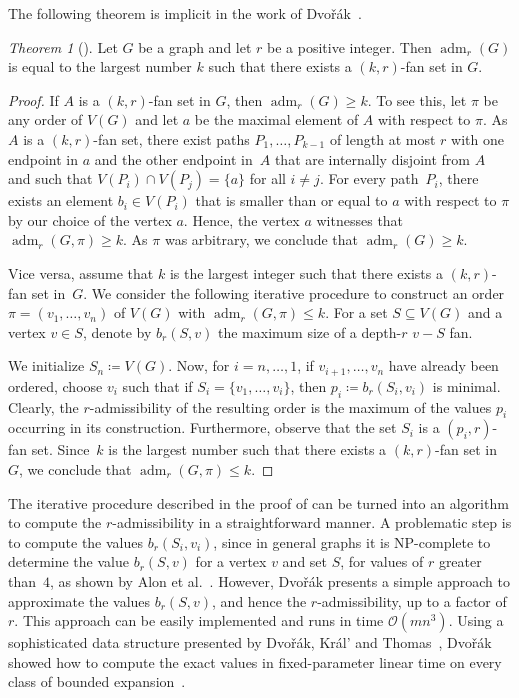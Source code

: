 \documentclass[1p,number,a4paper]{elsarticle}
\theoremstyle{remark}
\newcommand{\Oof}{\mathcal{O}}
\DeclareMathOperator{\adm}{adm}
\newtheorem{theorem}{Theorem}[section]
\begin{document}
The following theorem is implicit in the work of Dvo\v{r}\'ak~\cite{dvovrak2013constant}. 

\begin{theorem}[\cite{dvovrak2013constant}]\label{thm:adm}
Let $G$ be a graph and let $r$ be a positive integer. Then 
$\adm_r(G)$ is equal to the largest number $k$ such that
there exists a $(k,r)$-fan set in $G$. 
\end{theorem}
\begin{proof}
If $A$ is a $(k,r)$-fan set in $G$, then $\adm_r(G)\geq k$. 
To see this, let $\pi$ be any order of $V(G)$ and let $a$ be the maximal 
element of $A$ with respect to $\pi$. As $A$ is a $(k,r)$-fan set,
there exist paths $P_1,\ldots, P_{k-1}$ of length at most $r$ 
with one endpoint in $a$
and the other endpoint in~$A$ 
that are internally disjoint
from $A$ and such that $V(P_i)\cap V(P_j)=\{a\}$ for all 
$i\neq j$. For every path~$P_i$, there exists an element 
$b_i\in V(P_i)$ that is smaller than or equal to $a$ with respect to $\pi$ by
our choice of the vertex $a$. Hence, the vertex $a$ witnesses
that $\adm_r(G,\pi)\geq k$. 
As $\pi$ was arbitrary, we conclude
that $\adm_r(G)\geq k$. 
 

Vice versa, assume that $k$ is the largest integer such 
that there exists a $(k,r)$-fan set in~$G$. We consider the 
following iterative procedure to construct an order $\pi=(v_1,\ldots,v_n)$ of $V(G)$ with $\adm_r(G,\pi)\leq k$. 
For a set $S\subseteq V(G)$ and a vertex $v\in S$, denote
by $b_r(S,v)$ the maximum size of a depth-$r$ $v-S$ fan. 

We initialize $S_n\coloneqq V(G)$. Now, for $i=n,\ldots, 1$,
if $v_{i+1},\ldots, v_n$ have already been ordered, choose 
$v_{i}$ such   that if $S_i=\{v_{1},\ldots, v_i\}$, then 
$p_i\coloneqq b_r(S_i,v_{i})$ is minimal. 
Clearly, the $r$-admissibility of the resulting order is
the maximum of the values $p_i$ occurring in its 
construction. Furthermore, observe that the set
$S_i$ is a $(p_i,r)$-fan set. Since~$k$ is the largest 
number such that there exists a $(k,r)$-fan set in $G$, 
we conclude that $\adm_r(G,\pi)\leq k$. 
\end{proof}

The iterative procedure described in the proof of 
can be turned into an algorithm to compute the $r$-admissibility
in a straightforward manner. A problematic step is to compute
the values $b_r(S_i,v_i)$, since in general graphs
it is NP-complete to determine the value $b_r(S,v)$ for a vertex
$v$ and set $S$, for values of $r$ greater than~$4$, as shown by Alon et al.~\cite{itai1982complexity}. However, Dvo\v{r}\'ak presents a simple approach
to approximate the values $b_r(S,v)$, and hence the $r$-admissibility, up to a factor of $r$. This 
approach can be easily implemented and runs in time $\Oof(mn^3)$. 
Using a sophisticated data structure presented by Dvo\v{r}\'ak, Kr\'al' and Thomas~\cite{dvovrak2013testing}, 
Dvo\v{r}\'ak showed how to compute the exact 
values in fixed-parameter linear time on every class of bounded
expansion~\cite{dvovrak2013constant}. 
\end{document}
